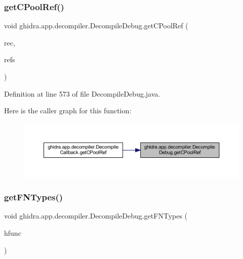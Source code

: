 \subsubsection{\texorpdfstring{getCPoolRef()}{getCPoolRef()}}
{\footnotesize\ttfamily void ghidra.\+app.\+decompiler.\+Decompile\+Debug.\+get\+C\+Pool\+Ref (\begin{DoxyParamCaption}\item[{String}]{rec,  }\item[{long \mbox{[}$\,$\mbox{]}}]{refs }\end{DoxyParamCaption})\hspace{0.3cm}{\ttfamily [inline]}}



Definition at line 573 of file Decompile\+Debug.\+java.

Here is the caller graph for this function\+:
\nopagebreak
\begin{figure}[H]
\begin{center}
\leavevmode
\includegraphics[width=350pt]{classghidra_1_1app_1_1decompiler_1_1_decompile_debug_ad15cca2c42d67c2c541cf17619cef018_icgraph}
\end{center}
\end{figure}
\mbox{\label{classghidra_1_1app_1_1decompiler_1_1_decompile_debug_a776b1bd42991b6e34f93bc0fc3dff45f}} 
\subsubsection{\texorpdfstring{getFNTypes()}{getFNTypes()}}
{\footnotesize\ttfamily void ghidra.\+app.\+decompiler.\+Decompile\+Debug.\+get\+F\+N\+Types (\begin{DoxyParamCaption}\item[{High\+Function}]{hfunc }\end{DoxyParamCaption})\hspace{0.3cm}{\ttfamily [inline]}}



